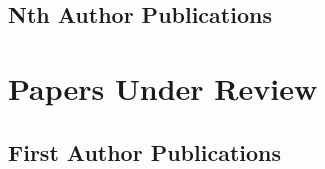 \documentclass[10pt,letterpaper]{article}
\begin{document}
\subsection*{Nth Author Publications}
\begin{bibunit}[bibstyle]
\nocite{2018MNRAS.477..219M}  %
\nocite{2018MNRAS.tmp.1094C}  %
\nocite{2018MNRAS.tmp..930F}  %
\nocite{2018MNRAS.474.4232K}  %
\nocite{2018ApJ...853..109E}  %
\nocite{2018MNRAS.473.1930E}  %
\nocite{2016MNRAS.463.1916F}  %
\nocite{2016MNRAS.463L..31L}  %
\nocite{2016MNRAS.459.1489B}  %
\nocite{2016MNRAS.456.4346H}  %
\nocite{2015MNRAS.454.2039F}  %
\nocite{2015MNRAS.453.3568D}  %
\nocite{2015MNRAS.453...29E}  %
\nocite{2015MNRAS.453.1305W}  %
\nocite{2015ApJ...807...49W}  %
\nocite{2014MNRAS.445..614W}  %
\nocite{2014ApJ...794..115D}  %
\nocite{2014MNRAS.443L..44B}  %
\nocite{2014MNRAS.439...73Y}  %
\nocite{2014ApJ...784L..14B}  %
\nocite{2014PhRvD..89b5017H}  %
\nocite{2014MNRAS.437.1894O}  %
\nocite{2013MNRAS.430...81R}  %
\vspace{-3em}
\putbib[mypubs]
\end{bibunit}

\section*{Papers Under Review}

\subsection*{First Author Publications}
\begin{bibunit}[bibstyle]
\nocite{2017arXiv171203966G}  %
\vspace{-3em}
\putbib[mypubs]
\end{bibunit}
\end{document}
